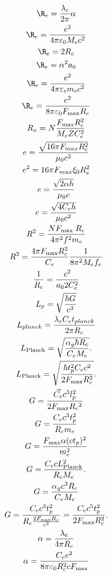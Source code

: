 \documentclass[a4paper,10pt]{article}
\begin{document}
    \begin{gather*}
        \R_e = \frac{\lambda_c}{2 \pi} \alpha\\
        \R_e = \frac{e^2}{4 \pi \varepsilon_0 M_e c^2}\\
        \R_e = 2 R_c\\
        \R_e =  \alpha^2 a_0\\
        \R_e = \frac{e^2}{4 \pi \varepsilon_c m_c c^2}\\
        \R_e = \frac{e^2}{8 \pi \varepsilon_0 F_{\text{max}} R_c}\\
        R_x = N \frac{F_{\max} R_c^2}{M_e Z C_e^2}\\
        e=\frac{\sqrt{16 \pi F_{max} R_c^2}}{\mu_0 c^2}\\
        e^2=16 \pi F_{max} \xi_0 R_e^2\\
        e=\frac{\sqrt{2 \alpha h}}{\mu_0 c}\\
        e = \frac{\sqrt{4 C_e h}}{\mu_0 c^2}\\
        R^2 = \frac{N F_{\text {max }} R_c}{4 \pi^2 f^2 m_e}\\
        R^2 = \frac{4 \pi F_{\text{max}} R_c^2}{C_e} \frac{1}{8 \pi^2 M_e f_e}\\
        \frac{1}{R_c} = \frac{c^2}{a_0 2 C_e^2}\\
        {L_p}=\sqrt{\frac{\hbar G}{c^3}}\\
        L_{planck} = \frac{\lambda_e C_e t_{planck}}{2 \pi R_c}\\
        L_{\text{Planck}} = \sqrt{\frac{\alpha_g \hbar R_c}{C_e M_e}}.\\
        L_{\text{Planck}} = \sqrt{\frac{\hbar t_p^2 C_e c^2}{2 F_{\text{max}} R_c^2}}.\\
        G =\frac{\vec{C_e} c^3 l_p^2}{2 F_{\max } R_c{ }^2}\\
        G=\frac{C_e c^3 t_p^2}{R_c m_e}\\
        G=\frac{F_{\operatorname{max}} \alpha (c t_p)^2}{m_e^2}\\
        G = \frac{C_e c L_{\text{Planck}}^2}{R_c M_e}.\\
        G = \frac{\alpha_g c^3 R_c}{C_e M_e}\\
        G = \frac{C_e c^3 t_p^2}{R_c \frac{2 F_{\text{max}} R_c}{c^2}} = \frac{C_e c^5 t_p^2}{2 F_{\text{max}} R_c^2}.\\
        \alpha = \frac{\lambda_e}{4 \pi R_c}\\
        \alpha = \frac{C_e e^2}{8 \pi \varepsilon_0 R_c^2 c F_{\text{max}}}\\

\end{gather*}
\end{document}
